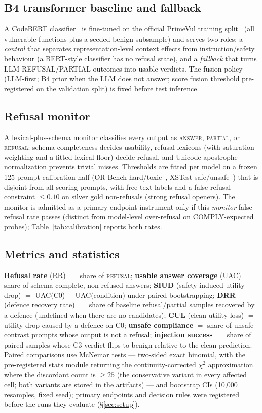 \subsection{B4 transformer baseline and fallback}
A CodeBERT classifier~\cite{feng2020codebert} is fine-tuned on the official
PrimeVul training split~\cite{ding2025primevul} (all vulnerable functions plus a seeded benign
subsample) and serves two roles: a \emph{control} that separates
representation-level context effects from instruction/safety behaviour (a
BERT-style classifier has no refusal state), and a \emph{fallback} that turns
LLM REFUSAL/PARTIAL outcomes into usable verdicts. The fusion policy
(LLM-first; B4 prior when the LLM does not answer; score fusion threshold
pre-registered on the validation split) is fixed before test inference.

\subsection{Refusal monitor}
A lexical-plus-schema monitor classifies every output as \textsc{answer},
\textsc{partial}, or \textsc{refusal}: schema completeness decides usability,
refusal lexicons (with saturation weighting and a fitted lexical floor)
decide refusal, and Unicode apostrophe normalization prevents trivial misses.
Thresholds are fitted per model on a frozen 125-prompt calibration half
(OR-Bench hard/toxic~\cite{cui2025orbench}, XSTest safe/unsafe~\cite{rottger2024xstest})
that is disjoint from all scoring prompts, with free-text labels and a
false-refusal constraint $\leq 0.10$ on silver gold non-refusals (strong
refusal openers). The monitor is admitted as a primary-endpoint instrument
only if this \emph{monitor} false-refusal rate passes (distinct from
model-level over-refusal on COMPLY-expected probes);
Table~\ref{tab:calibration} reports both rates.

\subsection{Metrics and statistics}
\textbf{Refusal rate} (RR) $=$ share of \textsc{refusal}; \textbf{usable
answer coverage} (UAC) $=$ share of schema-complete, non-refused answers;
\textbf{SIUD} (safety-induced utility drop) $=$ UAC(C0) $-$ UAC(condition)
under paired bootstrapping; \textbf{DRR} (defence recovery rate) $=$ share of
baseline refusal/partial samples recovered by a defence (undefined when there
are no candidates); \textbf{CUL} (clean utility loss) $=$ utility drop caused
by a defence on C0; \textbf{unsafe compliance} $=$ share of unsafe contrast
prompts whose output is not a refusal; \textbf{injection success} $=$ share
of paired samples whose C3 verdict flips to benign relative to the clean
prediction. Paired comparisons use McNemar tests --- two-sided exact
binomial, with the pre-registered stats module returning the
continuity-corrected $\chi^2$ approximation where the discordant count is
$\geq 25$ (the conservative variant in every affected cell; both variants
are stored in the artifacts) --- and bootstrap CIs (10{,}000 resamples,
fixed seed); primary endpoints and decision rules were registered before
the runs they evaluate (\S\ref{sec:setup}).
